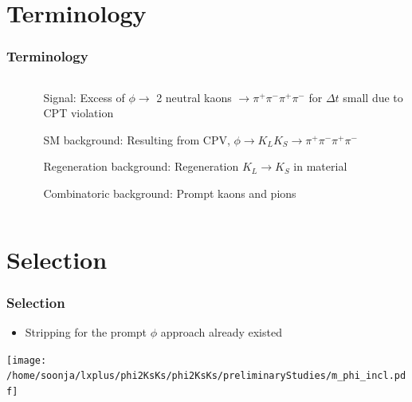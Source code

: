 \documentclass{beamer}
\begin{document}
\section{Terminology}
\begin{frame}
\frametitle{Terminology}
\begin{columns}
\begin{column}{.4\columnwidth}
$\frac{}{}$
\end{column}
\begin{column}{.6\columnwidth}
\begin{itemize}
\item[Signal: ] Excess of $\phi \rightarrow $ 2 neutral kaons $ \rightarrow \pi^+\pi^-\pi^+\pi^-$ for $\Delta t$ small due to CPT violation
\item[SM background: ] Resulting from CPV, $\phi \rightarrow K_L K_S \rightarrow \pi^+\pi^-\pi^+\pi^-$
\item[Regeneration background: ] Regeneration $K_L \rightarrow K_S$ in material\
\item[Combinatoric background: ] Prompt kaons and pions

\end{itemize}
\end{column}
\end{columns}






\end{frame}


\section{Selection}
\begin{frame}
\frametitle{Selection}

\begin{itemize}
\item Stripping for the prompt $\phi$ approach already existed
\end{itemize}

\centering
\texttt{[image: /home/soonja/lxplus/phi2KsKs/phi2KsKs/preliminaryStudies/m\_phi\_incl.pdf]}

\end{frame}
\end{document}
